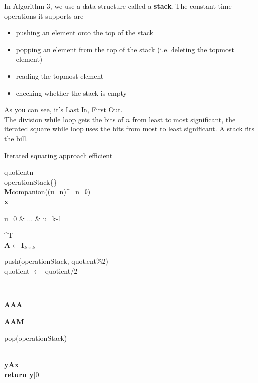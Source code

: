 \documentclass[a4paper,12pt]{article}
\numberwithin{definition}{section}
\numberwithin{mytheorem}{subsection}
\begin{document}
In Algorithm 3, we use a data structure called a \textbf{stack}. The constant time operations it supports
are
\begin{itemize}
\item pushing an element onto the top of the stack
\item popping an element from the top of the stack (i.e. deleting the topmost element)
\item reading the topmost element
\item checking whether the stack is empty
\end{itemize}
As you can see, it’s Last In, First Out.\\
The division while loop gets the bits of $n$ from least to most significant, the iterated square while
loop uses the bits from most to least significant. A stack fits the bill.\\
\begin{algorithm}[ht]
\label{algo:3}
\caption{Iterated squaring approach \textsf{efficient}}
\SetAlgoLined
\DontPrintSemicolon
{}
\textsf{quotient}\longleftarrow n\\
\textsf{operationStack}\longleftarrow \{\}\\
\textbf{M}\longleftarrow \textsf{companion}((u_n)^\infty_{n=0})\\
\textbf{x}\longleftarrow \begin{bmatrix} u_0 & ... & u_{k-1} \end{bmatrix}^{T}\\
\textbf{A}$\longleftarrow$$\textbf{I}_{k\times k}$\\



{
    \textsf{push(operationStack, quotient\%2)\\
    quotient $\longleftarrow$ quotient/2}

}\\
\EndWhile

{
    \textbf{A}\longleftarrow\textbf{A}\cdot\textbf{A}\\
    {
                {
                    \textbf{A}\longleftarrow\textbf{A}\cdot\textbf{M}\\
                }
           \EndIf
        
     }
    \textsf{pop(operationStack)}\\  
}       


        
    
      



\EndWhile

\\
\textbf{y}\longleftarrow\textbf{Ax}\\
\textbf{return y}[0] 


\end{algorithm}
\\
\end{document}
